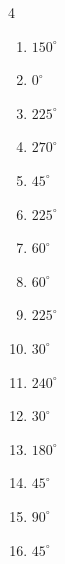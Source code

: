 \begin{multicols}{4}
\begin{enumerate}
  \item $\displaystyle 150^{\circ}$

  \item $\displaystyle 0^{\circ}$
        \phantom{$\displaystyle =0$}

  \item $\displaystyle 225^{\circ}$

  \item $\displaystyle 270^{\circ}$

  \item $\displaystyle 45^{\circ}$

  \item $\displaystyle 225^{\circ}$

  \item $\displaystyle 60^{\circ}$

  \item $\displaystyle 60^{\circ}$

  \item $\displaystyle 225^{\circ}$

  \item $\displaystyle 30^{\circ}$

  \item $\displaystyle 240^{\circ}$

  \item $\displaystyle 30^{\circ}$

  \item $\displaystyle 180^{\circ}$
        \phantom{$\displaystyle =\pi$}

  \item $\displaystyle 45^{\circ}$

  \item $\displaystyle 90^{\circ}$

  \item $\displaystyle 45^{\circ}$


\end{enumerate}
\end{multicols}
